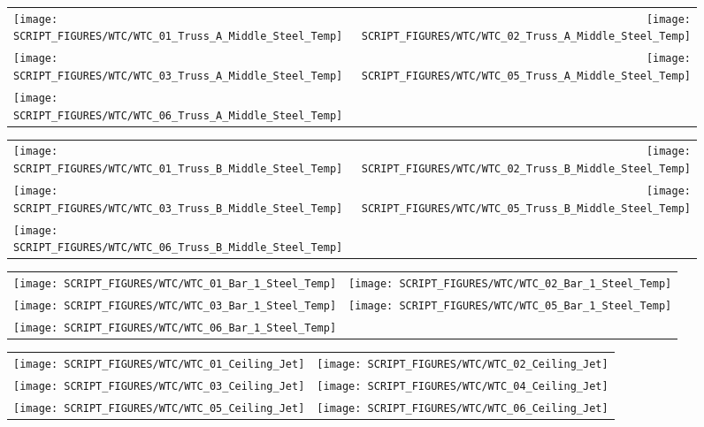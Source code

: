 \begin{figure}[p]
\begin{tabular*}{\textwidth}{l@{\extracolsep{\fill}}r}
\texttt{[image: SCRIPT\_FIGURES/WTC/WTC\_01\_Truss\_A\_Middle\_Steel\_Temp]} &
\texttt{[image: SCRIPT\_FIGURES/WTC/WTC\_02\_Truss\_A\_Middle\_Steel\_Temp]} \\
\texttt{[image: SCRIPT\_FIGURES/WTC/WTC\_03\_Truss\_A\_Middle\_Steel\_Temp]} &
\texttt{[image: SCRIPT\_FIGURES/WTC/WTC\_05\_Truss\_A\_Middle\_Steel\_Temp]} \\
\texttt{[image: SCRIPT\_FIGURES/WTC/WTC\_06\_Truss\_A\_Middle\_Steel\_Temp]}
\end{tabular*}
\end{figure}

\begin{figure}[p]
\begin{tabular*}{\textwidth}{l@{\extracolsep{\fill}}r}
\texttt{[image: SCRIPT\_FIGURES/WTC/WTC\_01\_Truss\_B\_Middle\_Steel\_Temp]} &
\texttt{[image: SCRIPT\_FIGURES/WTC/WTC\_02\_Truss\_B\_Middle\_Steel\_Temp]} \\
\texttt{[image: SCRIPT\_FIGURES/WTC/WTC\_03\_Truss\_B\_Middle\_Steel\_Temp]} &
\texttt{[image: SCRIPT\_FIGURES/WTC/WTC\_05\_Truss\_B\_Middle\_Steel\_Temp]} \\
\texttt{[image: SCRIPT\_FIGURES/WTC/WTC\_06\_Truss\_B\_Middle\_Steel\_Temp]}
\end{tabular*}
\end{figure}

\begin{figure}[p]
\begin{tabular*}{\textwidth}{l@{\extracolsep{\fill}}r}
\texttt{[image: SCRIPT\_FIGURES/WTC/WTC\_01\_Bar\_1\_Steel\_Temp]} &
\texttt{[image: SCRIPT\_FIGURES/WTC/WTC\_02\_Bar\_1\_Steel\_Temp]} \\
\texttt{[image: SCRIPT\_FIGURES/WTC/WTC\_03\_Bar\_1\_Steel\_Temp]} &
\texttt{[image: SCRIPT\_FIGURES/WTC/WTC\_05\_Bar\_1\_Steel\_Temp]} \\
\texttt{[image: SCRIPT\_FIGURES/WTC/WTC\_06\_Bar\_1\_Steel\_Temp]}
\end{tabular*}
\end{figure}

\begin{figure}[p]
\begin{tabular*}{\textwidth}{l@{\extracolsep{\fill}}r}
\texttt{[image: SCRIPT\_FIGURES/WTC/WTC\_01\_Ceiling\_Jet]} &
\texttt{[image: SCRIPT\_FIGURES/WTC/WTC\_02\_Ceiling\_Jet]} \\
\texttt{[image: SCRIPT\_FIGURES/WTC/WTC\_03\_Ceiling\_Jet]} &
\texttt{[image: SCRIPT\_FIGURES/WTC/WTC\_04\_Ceiling\_Jet]} \\
\texttt{[image: SCRIPT\_FIGURES/WTC/WTC\_05\_Ceiling\_Jet]} &
\texttt{[image: SCRIPT\_FIGURES/WTC/WTC\_06\_Ceiling\_Jet]}
\end{tabular*}
\end{figure}

